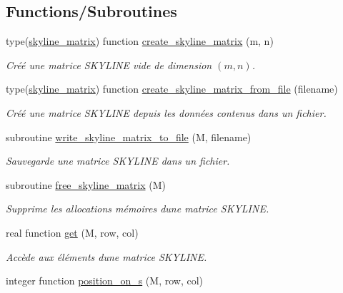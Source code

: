 \subsection*{Functions/\+Subroutines}
\begin{DoxyCompactItemize}
\item 
type(\hyperlink{structskyline_1_1skyline__matrix}{skyline\+\_\+matrix}) function \hyperlink{namespaceskyline_a5fe1d351df2e3a07f96028d1d2a892a8}{create\+\_\+skyline\+\_\+matrix} (m, n)
\begin{DoxyCompactList}\small\item\em Créé une matrice S\+K\+Y\+L\+I\+NE vide de dimension $(m,n)$. \end{DoxyCompactList}\item 
type(\hyperlink{structskyline_1_1skyline__matrix}{skyline\+\_\+matrix}) function \hyperlink{namespaceskyline_a86a4fe28bc106ef42d25cf7596c108bf}{create\+\_\+skyline\+\_\+matrix\+\_\+from\+\_\+file} (filename)
\begin{DoxyCompactList}\small\item\em Créé une matrice S\+K\+Y\+L\+I\+NE depuis les données contenus dans un fichier. \end{DoxyCompactList}\item 
subroutine \hyperlink{namespaceskyline_a3377a8391ad2d61659689fc8c4130bdc}{write\+\_\+skyline\+\_\+matrix\+\_\+to\+\_\+file} (M, filename)
\begin{DoxyCompactList}\small\item\em Sauvegarde une matrice S\+K\+Y\+L\+I\+NE dans un fichier. \end{DoxyCompactList}\item 
subroutine \hyperlink{namespaceskyline_a583c70b26e3bcb37ecb679f5c11ec2f4}{free\+\_\+skyline\+\_\+matrix} (M)
\begin{DoxyCompactList}\small\item\em Supprime les allocations mémoires d\textquotesingle{}une matrice S\+K\+Y\+L\+I\+NE. \end{DoxyCompactList}\item 
real function \hyperlink{namespaceskyline_a28077ec6714b830771f90da1b674b0ce}{get} (M, row, col)
\begin{DoxyCompactList}\small\item\em Accède aux éléments d\textquotesingle{}une matrice S\+K\+Y\+L\+I\+NE. \end{DoxyCompactList}\item 
integer function \hyperlink{namespaceskyline_a25b1e027d99abb67ab844d7b657a5843}{position\+\_\+on\+\_\+s} (M, row, col)

\end{DoxyCompactItemize}

